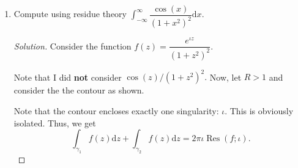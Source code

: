 \documentclass[12pt]{article}
\newcommand{\Res}{\operatorname{Res}}
\theoremstyle{definition}
\newenvironment{soln}{\begin{proof}[Solution]}{\end{proof}}
\begin{document}
\begin{enumerate}[leftmargin=*]
\begin{soln}
    	Noting that $\zeta^2 = \iota,$ we see that
    	\begin{align*} 
    		I_3(R) &= -\zeta\int_{0}^{R} e^{-\iota t^2} {\mathrm{d}}t\\
    		&= -\zeta\int_{0}^{R} (\cos t^2 - \iota\sin t^2) {\mathrm{d}}t.
    	\end{align*}

    	As observed earlier, we have
    	\begin{equation*} 
    		I_1(R) + I_2(R) + I_3(R) = 0
    	\end{equation*}
    	for all $R > 0.$ Letting $R \to \infty,$ we see that $I_2(R) \to 0$ and $I_1(R) \to \dfrac{\sqrt{\pi}}{2}.$ Thus, we get

    	\begin{equation*} 
    		\zeta\int_{0}^{\infty} (\cos t^2 - \iota\sin t^2) {\mathrm{d}}t = \dfrac{\sqrt{\pi}}{2}.
    	\end{equation*}
    	Letting $C \vcentcolon= \displaystyle\int_{0}^{\infty}\cos t^2{\mathrm{d}}t$ and $S$ the analogous one for $\sin,$ we note
    	\begin{align*} 
    		\zeta(C - \iota S) &= \dfrac{\sqrt{\pi}}{2}\\
    		\implies \dfrac{1}{\sqrt{2}}\left((C + S) + \iota(C - S)\right) &= \dfrac{\sqrt{\pi}}{2}.
    	\end{align*}
    	Since $C$ and $S$ are both real, we compare the real imaginary parts of the two sides above to finally get

    	\begin{equation*} 
    		C = S = \dfrac{\pi}{2\sqrt{2}},
    	\end{equation*}
    	as desired.
    \end{soln}
    \item Compute using residue theory $\int_{-\infty}^{\infty} \dfrac{\cos(x)}{(1 + x^2)^2} {\mathrm{d}}x.$
    \begin{soln}
    	Consider the function $f(z) = \dfrac{e^{\iota z}}{(1 + z^2)^2}.$

    	Note that I did \textbf{not} consider $\cos(z)/(1 + z^2)^2.$ Now, let $R > 1$ and consider the the contour as shown.

    	\begin{center}
    	\end{center}
    	Note that the contour encloses exactly one singularity: $\iota.$ This is obviously isolated. Thus, we get
    	\begin{equation*} 
    		\int_{\gamma_1}^{} f(z) {\mathrm{d}}z + \int_{\gamma_2}^{} f(z) {\mathrm{d}}z = 2\pi\iota\Res(f; \iota).
    	\end{equation*}


\end{soln}
\end{enumerate}
\end{document}

